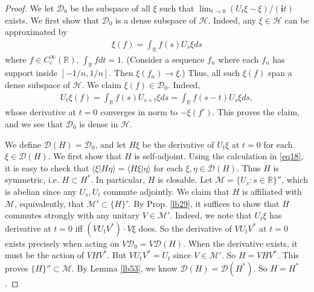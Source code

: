 \documentclass[12pt,b5paper,notitlepage]{article}
\theoremstyle{definition}
\theoremstyle{plain}
\newcommand{\mc}{\mathcal}
\newcommand{\Dom}{\scr D}
\newcommand{\bk}[1]{\langle {#1}\rangle}
\newcommand{\scr}{\mathscr}
\newcommand{\im}{\mathbf{i}}
\newcommand{\Rbb}{\mathbb R}
\numberwithin{equation}{section}
\begin{document}
\begin{proof}
We let $\Dom_0$ be the subspace of all $\xi$ such that $\lim_{t\rightarrow 0}(U_t\xi-\xi)/(\im t)$ exists. We first show that $\Dom_0$ is a dense subspace of $\mc H$. Indeed, any $\xi\in\mc H$ can be approximated by
\begin{align*}
\xi(f)=\int_\Rbb f(s)U_s\xi ds	
\end{align*}
where $f\in C_c^\infty(\Rbb)$,  $\int_\Rbb fdt=1$. (Consider a sequence $f_n$ where each $f_n$ has support inside $[-1/n,1/n]$. Then $\xi(f_n)\rightarrow\xi$.) Thus, all such $\xi(f)$ span a dense subspace of $\mc H$. We claim $\xi(f)\in\Dom_0$. Indeed,
\begin{align*}
U_t\xi(f)=\int_\Rbb f(s)U_{s+t}\xi ds=\int_\Rbb f(s-t)U_s\xi ds,	
\end{align*}
whose derivative at $t=0$ converges in norm to $-\xi(f')$. This proves the claim, and we see that $\Dom_0$ is dense in $\mc H$.

We define $\Dom(H)=\Dom_0$, and let $H\xi$ be the derivative of $U_t\xi$ at $t=0$ for each $\xi\in\Dom(H)$. We first show that $H$ is self-adjoint. Using the calculation in \eqref{eq18}, it is easy to check that $\bk{\xi|H\eta}=\bk{H\xi|\eta}$ for each $\xi,\eta\in\Dom(H)$. Thus $H$ is symmetric, i.e. $H\subset H^*$. In particular, $H$ is closable. Let $\mc M=\{U_s:s\in\Rbb\}''$, which is abelian since any $U_s,U_t$ commute adjointly. We claim that $H$ is affiliated with $\mc M$, equivalently, that $\mc M'\subset\{H\}'$. By Prop. \ref{lb29}, it suffices to show that $H$ commutes strongly with any unitary $V\in\mc M'$. Indeed, we note that $U_t\xi$ has derivative at $t=0$ iff $(VU_tV^*)\cdot V\xi$ does. So the derivative of $VU_tV^*$ at $t=0$ exists precisely when acting on $V\Dom_0=V\Dom(H)$. When the derivative exists, it must be the action of $VHV^*$. But $VU_tV^*=U_t$ since $V\in\mc M'$. So $H=VHV^*$. This proves $\{H\}''\subset\mc M$. By Lemma \ref{lb53}, we know $\Dom(H)=\Dom(H^*)$. So $H=H^*$.


\end{proof}
\end{document}
